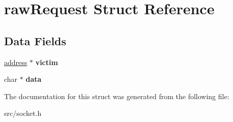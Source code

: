 \hypertarget{structrawRequest}{
\section{rawRequest Struct Reference}
\label{structrawRequest}
}
\subsection*{Data Fields}
\begin{DoxyCompactItemize}
\item 
\hypertarget{structrawRequest_afd5a3ee96fb534951e7547afa18f85cd}{
\hyperlink{structaddress}{address} $\ast$ {\bfseries victim}}
\label{structrawRequest_afd5a3ee96fb534951e7547afa18f85cd}

\item 
\hypertarget{structrawRequest_ab074d6dc96848db63e2c120613b0150e}{
char $\ast$ {\bfseries data}}
\label{structrawRequest_ab074d6dc96848db63e2c120613b0150e}

\end{DoxyCompactItemize}


The documentation for this struct was generated from the following file:\begin{DoxyCompactItemize}
\item 
src/socket.h\end{DoxyCompactItemize}
